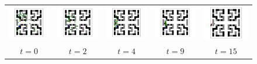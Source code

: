\documentclass[letterpaper]{article} %
\begin{document}
\begin{figure}[t]
	\centering
	\begin{tabular}{ccccc}
		\includegraphics[width=0.18\linewidth]{figs/97/0.pdf} &
		\includegraphics[width=0.18\linewidth]{figs/97/2.pdf} &
		\includegraphics[width=0.18\linewidth]{figs/97/4.pdf} &
		\includegraphics[width=0.18\linewidth]{figs/97/9.pdf} &
		\includegraphics[width=0.18\linewidth]{figs/97/26.pdf} \\
		$t=0$ & $t=2$ & $t=4$ & $t=9$ & $t=15$
	\end{tabular}
\end{figure}
\end{document}
